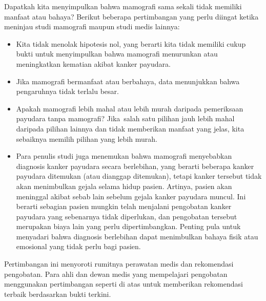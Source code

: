 Dapatkah kita menyimpulkan bahwa mamografi sama sekali tidak memiliki manfaat atau bahaya?
Berikut beberapa pertimbangan yang perlu diingat ketika meninjau
studi mamografi maupun studi medis lainnya:
\begin{itemize}
\setlength{\itemsep}{0mm}
\item
    Kita tidak menolak hipotesis nol, yang berarti
    kita tidak memiliki cukup bukti untuk menyimpulkan bahwa
    mamografi menurunkan atau meningkatkan kematian akibat kanker payudara.
\item
    Jika mamografi bermanfaat atau berbahaya, data
    menunjukkan bahwa pengaruhnya tidak terlalu besar.
\item
    Apakah mamografi lebih mahal atau lebih murah daripada
    pemeriksaan payudara tanpa mamografi?
    Jika~salah satu pilihan jauh lebih mahal daripada
    pilihan lainnya dan tidak memberikan manfaat yang jelas,
    kita sebaiknya memilih
    pilihan yang lebih murah.
\item
    Para penulis studi juga menemukan bahwa mamografi
    menyebabkan diagnosis kanker payudara secara berlebihan,
    yang berarti beberapa kanker payudara ditemukan
    (atau dianggap ditemukan), tetapi kanker tersebut
    tidak akan menimbulkan gejala selama hidup pasien.
    Artinya, pasien akan meninggal akibat sebab lain
    sebelum gejala kanker payudara muncul.
    Ini berarti sebagian pasien mungkin telah menjalani pengobatan
    kanker payudara yang sebenarnya tidak diperlukan, dan
    pengobatan tersebut merupakan biaya lain yang perlu dipertimbangkan.
    Penting pula untuk menyadari bahwa
    diagnosis berlebihan dapat menimbulkan bahaya fisik
    atau emosional yang tidak perlu bagi pasien.
\end{itemize}
Pertimbangan ini menyoroti rumitnya perawatan medis dan rekomendasi pengobatan. Para ahli dan dewan medis yang mempelajari pengobatan menggunakan pertimbangan seperti di atas untuk memberikan rekomendasi terbaik berdasarkan bukti terkini.


